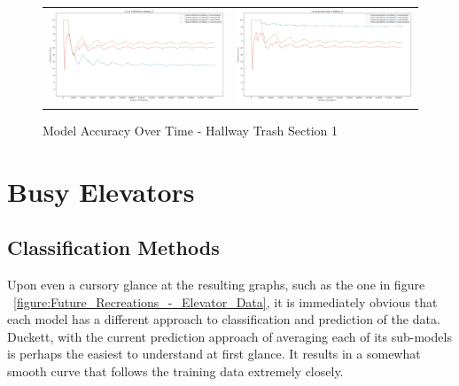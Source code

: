 \begin{figure}
  \begin{tabular}{cc}
    {\includegraphics[width = 3in]{images/results/Future_Predictions_on_hallway_T1.png}} &
    {\includegraphics[width = 3in]{images/results/Historical_Predictions_on_hallway_T1.png}} \\
  \end{tabular}
  \caption{Model Accuracy Over Time - Hallway Trash Section 1}
\end{figure}




\section{ Busy Elevators }

\subsection{ Classification Methods }

Upon even a cursory glance at the resulting graphs, such as the one in figure
~\ref{figure:Future_Recreations_-_Elevator_Data}, it is immediately
obvious that each model has a different approach to classification and
prediction of the data. Duckett, with the current prediction approach of
averaging each of its sub-models is perhaps the easiest to understand at first
glance. It results in a somewhat smooth curve that follows the training data
extremely closely. \\

